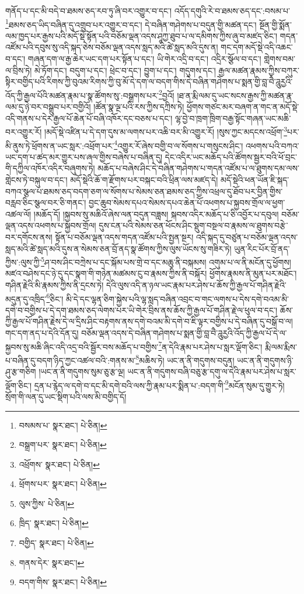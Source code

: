 གནོད་པ་དང་མི་བདེ་བ་ཐམས་ཅད་རབ་ཏུ་ཞི་བར་འགྱུར་བ་དང་། འདོད་དགུའི་རེ་བ་ཐམས་ཅད་དང་:བསམ་པ་\footnote{བསམས་པ་  སྣར་ཐང་།  པེ་ཅིན། }ཐམས་ཅད་ཡིད་བཞིན་དུ་འགྲུབ་པར་འགྱུར་བ་དང་། དེ་བཞིན་གཤེགས་པ་བདུན་གྱི་མཚན་དང་། སྔོན་གྱི་སྨོན་ལམ་ཁྱད་པར་རྒྱས་པའི་མདོ་སྡེ་སྟོན་པའི་བཅོམ་ལྡན་འདས་ཤཱཀྱ་ཐུབ་པ་ལ་དམིགས་ཀྱིས་ཞུ་བ་མཛད་ཅིང་། གདན་འཛོམ་པའི་དབུས་སུ་འདི་སྐད་ཅེས་བཅོམ་ལྡན་འདས་སླད་མའི་ཚེ་སླད་མའི་དུས་ན། གང་དག་མདོ་སྡེ་འདི་འཆང་བ་དང་། གཞན་དག་ལ་རྒྱ་ཆེར་ཡང་དག་པར་སྟོན་པ་དང་། ཡི་གེར་འདྲི་བ་དང་། འདྲིར་སྩོལ་བ་དང་། གླེགས་བམ་ལ་བྲིས་ཏེ། མེ་ཏོག་དང་། བདུག་པ་དང་། ཕྲེང་བ་དང་། བྱུག་པ་དང་། གདུགས་དང་། རྒྱལ་མཚན་རྣམས་ཀྱིས་བཀུར་སྟིར་བགྱིད་པའི་རིགས་ཀྱི་བུའམ་རིགས་ཀྱི་བུ་མོ་དེ་དག་ལ་བདག་གིས་དེ་བཞིན་གཤེགས་པ་སྨན་གྱི་བླ་བཻ་ཌཱུརྱའི་འོད་ཀྱི་རྒྱལ་པོའི་མཚན་རྣམ་པ་སྣ་ཚོགས་སུ་:བསྒྲགས་པར་\footnote{བསྒྲག་པར་  སྣར་ཐང་།  པེ་ཅིན། }བྱའོ། །ཐ་ན་རྨི་ལམ་དུ་ཡང་སངས་རྒྱས་ཀྱི་མཚན་རྣ་ལམ་དུ་ཉེ་བར་བསྒྲུབ་པར་བགྱིའོ། །ཚོན་སྣ་ལྔ་པའི་རས་ཀྱིས་དཀྲིས་ཏེ། ཕྱོགས་གཙང་མར་བཞག་ན་གང་ན་མདོ་སྡེ་འདི་གནས་པ་དེར་རྒྱལ་པོ་ཆེན་པོ་བཞི་འཁོར་དང་བཅས་པ་དང་། ལྷ་བྱེ་བ་ཁྲག་ཁྲིག་བརྒྱ་སྟོང་གཞན་ཡང་མཆི་བར་འགྱུར་རོ། །མདོ་སྡེ་འཛིན་པ་དེ་དག་དུས་མ་ལགས་པར་འཆི་བར་མི་འགྱུར་རོ། །སུས་ཀྱང་མདངས་འཕྲོག་\footnote{འཕྲོགས་  སྣར་ཐང་།  པེ་ཅིན། }པར་མི་ནུས་ཏེ་ཕྲོགས་ན་ཡང་སླར་:འཕྲོག་པར་\footnote{ཕྲོགས་པར་  སྣར་ཐང་།  པེ་ཅིན། }འགྱུར་རོ་ཞེས་བགྱི་བ་ལ་སོགས་པ་གསུངས་ཤིང་། འཕགས་པའི་བཀའ་ཡང་དག་པ་ཚད་མར་གྱུར་པས་ཞལ་གྱིས་བཞེས་པ་བཞིན་དུ། དེང་འདིར་ཡང་མཆོད་པའི་ཚོགས་སྦྱར་བའི་ཕོ་བྲང་གི་དཀྱིལ་འཁོར་འདིར་བཞུགས་ཏེ། མཆོད་པ་བཞེས་ཤིང་དེ་བཞིན་གཤེགས་པ་གདན་འཛོམ་པ་ལ་ཐུགས་དམ་ལས་གླེངས་ཏེ་བསྐུལ་བ་དང་། མདོ་སྡེའི་ཆོ་ག་རྫོགས་པར་བསྐང་བའི་ཕྲིན་ལས་མཛད་དེ། མདོ་སྡེའི་ཕན་ཡོན་ཇི་སྐད་བཀའ་སྩལ་པ་ཐམས་ཅད་བདག་ཅག་ལ་སོགས་པ་སེམས་ཅན་ཐམས་ཅད་ཀྱིས་འཕྲལ་དུ་ཐོབ་པར་བྱིན་གྱིས་བརླབ་ཅིང་སྩལ་བར་ཅི་གནང་། བྱང་ཆུབ་སེམས་དཔའ་སེམས་དཔའ་ཆེན་པོ་འཕགས་པ་སྐྱབས་གྲོལ་ལ་ཕྱག་འཚལ་ལོ། །མཆོད་དོ། །སྐྱབས་སུ་མཆིའོ་ཞེས་ལན་བདུན་བཟླས། སྐབས་འདིར་མཆོད་པ་ཅི་འབྱོར་པ་དབུལ། བཅོམ་ལྡན་འདས་འཕགས་པ་སྐྱབས་གྲོལ། དུས་ངན་པའི་སེམས་ཅན་ཕོངས་ཤིང་སྡུག་བསྔལ་བ་རྣམས་ལ་ཐུགས་བརྩེ་བར་དགོངས་ནས། སྟོན་པ་བཅོམ་ལྡན་འདས་གདན་འཛོམ་པའི་སྤྱན་སྔར། འདི་སྐད་དུ་བཙུན་པ་བཅོམ་ལྡན་འདས་སླད་མའི་ཚེ་སླད་མའི་དུས་ན་སེམས་ཅན་བྲོ་ནད་སྣ་ཚོགས་ཀྱིས་ལུས་ཡོངས་སུ་གཟིར་ཏེ། ཡུན་རིང་པོར་བྲོ་ནད་ཀྱིས་:ལུས་ཀྱི་\footnote{ལུས་ཀྱིས་  པེ་ཅིན། }ཤ་བས་ཤིང་བཀྲེས་པ་དང་སྐོམ་པས་གྲེ་བ་དང་མཆུ་ནི་བསྐམས། འགུམ་པ་ལ་ནི་མངོན་དུ་ཕྱོགས། མཛའ་བཤེས་དང་ཉེ་དུ་དང་སྣག་གི་གཉེན་མཚམས་ངུ་བ་རྣམས་ཀྱིས་ནི་བསྐོར། ཕྱོགས་རྣམས་ནི་མུན་པར་མཐོང་། གཤིན་རྗེའི་མི་རྣམས་ཀྱིས་ནི་དྲངས་ཏེ། དེའི་ལུས་འདི་ན་ཉལ་ཡང་རྣམ་པར་ཤེས་པ་ཆོས་ཀྱི་རྒྱལ་པོ་གཤིན་རྗེའི་མདུན་དུ་འཁྲིད་\footnote{ཁྲིད་  སྣར་ཐང་།  པེ་ཅིན། }ཅིང་། མི་དེ་དང་ལྷན་ཅིག་སྐྱེས་པའི་ལྷ་སླད་བཞིན་འབྲང་བ་གང་ལགས་པ་དེས་དགེ་བའམ་མི་དགེ་བ་བགྱིས་པ་དེ་དག་ཐམས་ཅད་ལེགས་པར་ཡི་གེར་བྲིས་ནས་ཆོས་ཀྱི་རྒྱལ་པོ་གཤིན་རྗེ་ལ་ཕུལ་བ་དང་། ཆོས་ཀྱི་རྒྱལ་པོ་གཤིན་རྗེས་དེ་ལ་དྲིས་ཤིང་བརྟགས་ནས་དགེ་བའམ་མི་དགེ་བ་ཇི་ལྟར་བགྱིས་པ་དེ་བཞིན་དུ་བསྒོ་བ་ལ། གང་དག་ནད་པ་དེའི་དོན་དུ། བཅོམ་ལྡན་འདས་དེ་བཞིན་གཤེགས་པ་སྨན་གྱི་བླ་བཻ་ཌཱུརྱའི་འོད་ཀྱི་རྒྱལ་པོ་དེ་ལ་སྐྱབས་སུ་མཆི་ཞིང་འདི་འདྲ་བའི་སྦྱོར་བས་མཆོད་པ་བགྱིས་\footnote{བགྱིད་  སྣར་ཐང་།  པེ་ཅིན། }ན་དེའི་རྣམ་པར་ཤེས་པ་སླར་ལྡོག་ཅིང་། རྨི་ལམ་རྨིས་པ་བཞིན་དུ་བདག་ཉིད་ཀྱང་འཚལ་བའི་:གནས་མ་\footnote{གནས་དེར་  སྣར་ཐང་། }མཆིས་ཏེ། ཡང་ན་ནི་གདུགས་བདུན། ཡང་ན་ནི་གདུགས་ཉི་ཤུ་རྩ་གཅིག །ཡང་ན་ནི་གདུགས་སུམ་ཅུ་རྩ་ལྔ། ཡང་ན་ནི་གདུགས་བཞི་བཅུ་རྩ་དགུ་ལ་དེའི་རྣམ་པར་ཤེས་པ་སླར་ལྡོག་ཅིང་། དྲན་པ་རྙེད་ལ་དགེ་བ་དང་མི་དགེ་བའི་ལས་ཀྱི་རྣམ་པར་སྨིན་པ་:བདག་གི་\footnote{བདག་གིས་  སྣར་ཐང་།  པེ་ཅིན། }མངོན་སུམ་དུ་གྱུར་ཏེ། སྲོག་གི་ལན་དུ་ཡང་སྡིག་པའི་ལས་མི་བགྱིད་དོ། 
